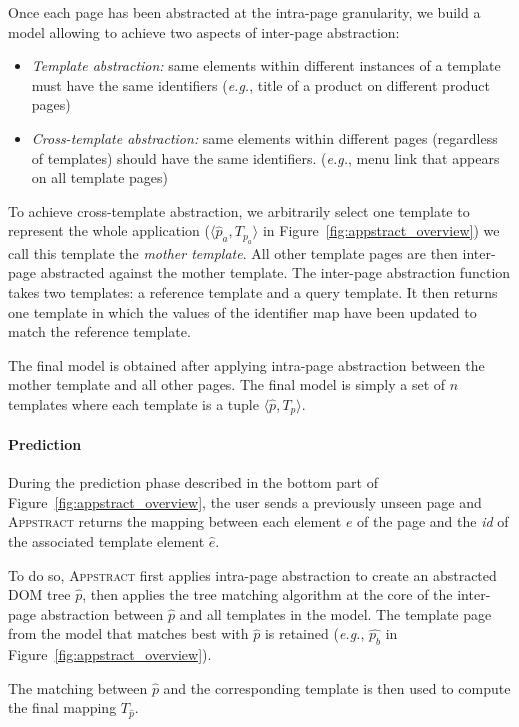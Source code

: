 \documentclass[sigconf,authordraft]{acmart}
\theoremstyle{definition}
\begin{document}
Once each page has been abstracted at the intra-page granularity, we build a model allowing to achieve two aspects of inter-page abstraction:
\begin{itemize}
    \item \textit{Template abstraction:} same elements within different instances of a template must have the same identifiers (\emph{e.g.}, title of a product on different product pages)
    \item \textit{Cross-template abstraction:} same elements within different pages (regardless of templates) should have the same identifiers. (\emph{e.g.}, menu link that appears on all template pages)
\end{itemize}

To achieve cross-template abstraction, we arbitrarily select one template to represent the whole application ($\langle \hat{p}_a, T_{p_a} \rangle$ in Figure~\ref{fig:appstract_overview}) we call this template the \textit{mother template}.
All other template pages are then inter-page abstracted against the mother template. 
The inter-page abstraction function takes two templates: a reference template and a query template. It then returns one template in which the values of the identifier map have been updated to match the reference template.

The final model is obtained after applying intra-page abstraction between the mother template and all other pages.
The final model is simply a set of $n$ templates where each template is a tuple $\langle \hat{p}, T_{p} \rangle$.

\paragraph{Prediction}
During the prediction phase described in the bottom part of Figure~\ref{fig:appstract_overview}, the user sends a previously unseen page and \textsc{Appstract} returns the mapping between each element $e$ of the page and the \textit{id} of the associated template element $\hat{e}$.

To do so, \textsc{Appstract} first applies intra-page abstraction to create an abstracted DOM tree $\hat{p}$, then applies the tree matching algorithm at the core of the inter-page abstraction between $\hat{p}$ and all templates in the model.
The template page from the model that matches best with $\hat{p}$ is retained (\emph{e.g.}, $\hat{p_b}$ in Figure~\ref{fig:appstract_overview}).

The matching between $\hat{p}$ and the corresponding template is then used to compute the final mapping $T_{\hat{p}}$.
\end{document}
